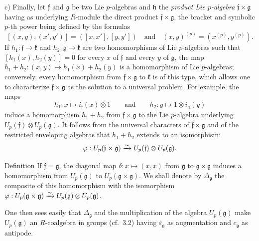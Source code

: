 \noindent c) Finally, let $\mathfrak f$ and $\mathfrak g$ be two Lie $p$-algebras and $\mathfrak h$ the \emph{product Lie $p$-algebra} $\mathfrak f\times\mathfrak g$ having as underlying $R$-module the direct product $\mathfrak f\times\mathfrak g$, the bracket and symbolic $p$-th power being defined by the formulas
\[
[(x,y),(x',y')]=([x,x'],[y,y'])\quad\text{and}\quad(x,y)^{(p)}=(x^{(p)},y^{(p)}).
\]
If $h_1:\mathfrak f\to\mathfrak k$ and $h_2:\mathfrak g\to\mathfrak k$ are two homomorphisms of Lie $p$-algebras such that $[h_1(x),h_2(y)]=0$ for every $x$ of $\mathfrak f$ and every $y$ of $\mathfrak g$, the map $h_1+h_2:(x,y)\mapsto h_1(x)+h_2(y)$ is a homomorphism of Lie $p$-algebras; conversely, every homomorphism from $\mathfrak f\times\mathfrak g$ to $\mathfrak k$ is of this type, which allows one to characterize $\mathfrak f\times\mathfrak g$ as the solution to a universal problem. For example, the maps
\[
h_1:x\mapsto i_{\mathfrak f}(x)\otimes1\qquad\text{and}\qquad h_2:y\mapsto1\otimes i_{\mathfrak g}(y)
\]
induce a homomorphism $h_1+h_2$ from $\mathfrak f\times\mathfrak g$ to the Lie $p$-algebra underlying $U_p(\mathfrak f)\otimes U_p(\mathfrak g)$. It follows from the universal characters of $\mathfrak f\times\mathfrak g$ and of the restricted enveloping algebras that $h_1+h_2$ extends to an isomorphism:
\[
\varphi:U_p(\mathfrak f\times\mathfrak g)\xrightarrow{\sim} U_p(\mathfrak f)\otimes U_p(\mathfrak g).
\]
\begin{enoncerm}{Definition}{}
If $\mathfrak f=\mathfrak g$, the diagonal map $\delta:x\mapsto(x,x)$ from $\mathfrak g$ to $\mathfrak g\times\mathfrak g$ induces a homomorphism from $U_p(\mathfrak g)$ to $U_p(\mathfrak g\times\mathfrak g)$. We shall denote by $\Delta_{\mathfrak g}$ the composite of this homomorphism with the isomorphism $\varphi:U_p(\mathfrak g\times\mathfrak g)\xrightarrow{\sim} U_p(\mathfrak g)\otimes U_p(\mathfrak g)$.
\end{enoncerm}
One then sees easily that $\Delta_{\mathfrak g}$ and the multiplication of the algebra $U_p(\mathfrak g)$ make $U_p(\mathfrak g)$ an $R$-coalgebra in groups (cf.\ 3.2) having $\varepsilon_{\mathfrak g}$ as augmentation and $c_{\mathfrak g}$ as antipode.

